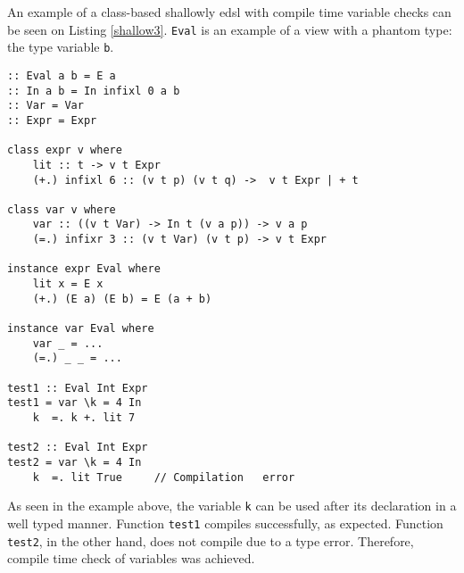 An example of a class-based shallowly \ac{edsl} with compile time variable checks can be seen on Listing \ref{shallow3}. \texttt{Eval} is an example of a view with a phantom type: the type variable \texttt{b}.

\begin{lstlisting}[caption=A simple shallowly \ac{edsl} with compile time variable checks,captionpos=b,label=shallow3]
:: Eval a b = E a
:: In a b = In infixl 0 a b
:: Var = Var
:: Expr = Expr

class expr v where
    lit :: t -> v t Expr
    (+.) infixl 6 :: (v t p) (v t q) ->  v t Expr | + t

class var v where
    var :: ((v t Var) -> In t (v a p)) -> v a p
    (=.) infixr 3 :: (v t Var) (v t p) -> v t Expr

instance expr Eval where
    lit x = E x
    (+.) (E a) (E b) = E (a + b)

instance var Eval where
    var _ = ...
    (=.) _ _ = ...

test1 :: Eval Int Expr
test1 = var \k = 4 In
    k  =. k +. lit 7

test2 :: Eval Int Expr
test2 = var \k = 4 In
    k  =. lit True     // Compilation   error
\end{lstlisting}

As seen in the example above, the variable \texttt{k} can be used after its declaration in a well typed manner. Function \texttt{test1} compiles successfully, as expected. Function \texttt{test2}, in the other hand, does not compile due to a type error. Therefore, compile time check of variables was achieved.


